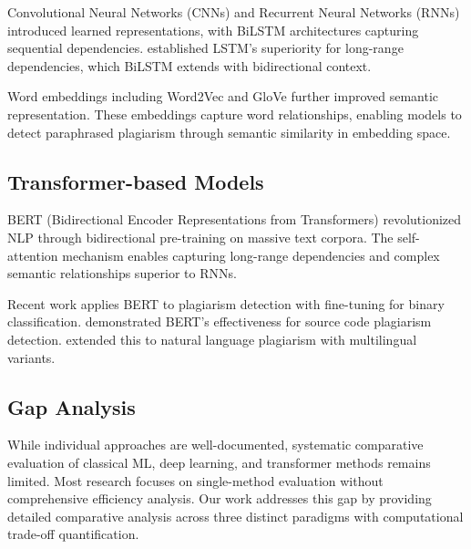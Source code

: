 Convolutional Neural Networks (CNNs) and Recurrent Neural Networks (RNNs) introduced learned representations, with BiLSTM architectures capturing sequential dependencies. \cite{Hochreiter1997} established LSTM's superiority for long-range dependencies, which BiLSTM extends with bidirectional context.

Word embeddings including Word2Vec \cite{Mikolov2013} and GloVe \cite{Pennington2014} further improved semantic representation. These embeddings capture word relationships, enabling models to detect paraphrased plagiarism through semantic similarity in embedding space.

\subsection{Transformer-based Models}

BERT (Bidirectional Encoder Representations from Transformers) \cite{Devlin2018} revolutionized NLP through bidirectional pre-training on massive text corpora. The self-attention mechanism \cite{Vaswani2017} enables capturing long-range dependencies and complex semantic relationships superior to RNNs.

Recent work applies BERT to plagiarism detection with fine-tuning for binary classification. \cite{Shivakumar2020} demonstrated BERT's effectiveness for source code plagiarism detection. \cite{Hosseini2021} extended this to natural language plagiarism with multilingual variants.

\subsection{Gap Analysis}

While individual approaches are well-documented, systematic comparative evaluation of classical ML, deep learning, and transformer methods remains limited. Most research focuses on single-method evaluation without comprehensive efficiency analysis. Our work addresses this gap by providing detailed comparative analysis across three distinct paradigms with computational trade-off quantification.
